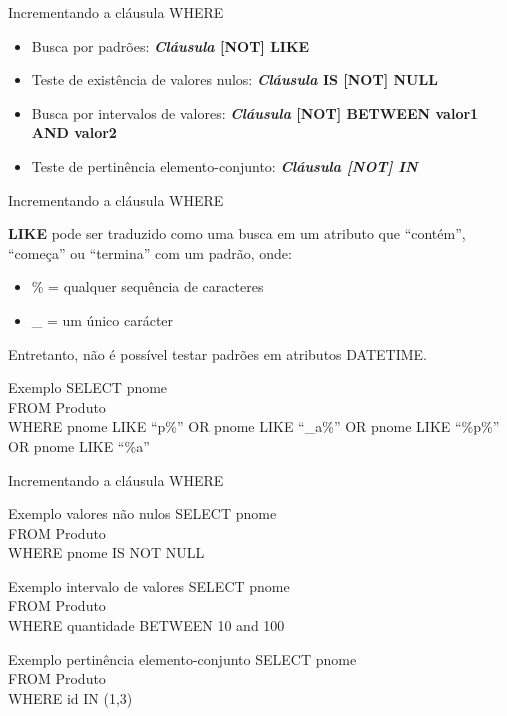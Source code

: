 \documentclass[aspectratio=169]{beamer}
\begin{document}
			\begin{frame}{Incrementando a cláusula WHERE}
				\begin{itemize}
					\item Busca por padrões: \textbf{\textit{Cláusula} [NOT] LIKE}
					\item Teste de existência de valores nulos: \textbf{\textit{Cláusula} IS [NOT] NULL}
					\item Busca por intervalos de valores: \textbf{\textit{Cláusula} [NOT] BETWEEN valor1 AND valor2}
					\item Teste de pertinência elemento-conjunto: \textbf{\textit{\textit{Cláusula} [NOT] IN}}
				\end{itemize}
			\end{frame}
		
			\begin{frame}{Incrementando a cláusula WHERE}
			
				\textbf{LIKE} pode ser traduzido como uma busca em um atributo que ``contém'', ``começa'' ou ``termina'' com um padrão, onde:
			
				\begin{itemize}
					\item \% = qualquer sequência de caracteres
					\item \_ = um único carácter
				\end{itemize}
				
				Entretanto, não é possível testar padrões em atributos DATETIME.
				
				\begin{block}{Exemplo}
					{\ttfamily
						SELECT pnome\\
						FROM Produto\\
						WHERE pnome LIKE ``p\%'' OR pnome LIKE ``\_a\%'' OR pnome LIKE ``\%p\%'' OR pnome LIKE ``\%a''
					}
				\end{block}
			\end{frame}
			
			\begin{frame}{Incrementando a cláusula WHERE}
			\BlankLine\BlankLine
				\begin{block}{Exemplo valores não nulos}
					{\ttfamily
						SELECT pnome\\
						FROM Produto\\
						WHERE pnome IS NOT NULL
					}
				\end{block}
	
				\begin{block}{Exemplo intervalo de valores}
					{\ttfamily
						SELECT pnome\\
						FROM Produto\\
						WHERE quantidade BETWEEN 10 and 100
					}
				\end{block}
			
				\begin{block}{Exemplo pertinência elemento-conjunto}
					{\ttfamily
						SELECT pnome\\
						FROM Produto\\
						WHERE id IN (1,3)
					}
				\end{block}
			\end{frame}
\end{document}
